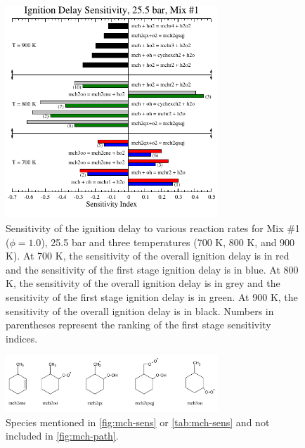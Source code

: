 \documentclass[12pt, letterpaper]{article}
\begin{document}
\begin{figure}
    \centering
    \includegraphics[angle=-90, width=8cm]{../figures/05-MCH/mch-sens}
    \caption{Sensitivity of the ignition delay to various reaction rates
        for Mix \#1 ($\phi=1.0$), 25.5 bar and three temperatures (700 K,
        800 K, and 900 K). At 700 K, the sensitivity of the overall
        ignition delay is in red and the sensitivity of the first stage
        ignition delay is in blue. At 800 K, the sensitivity of the overall
        ignition delay is in grey and the sensitivity of the first stage
        ignition delay is in green. At 900 K, the sensitivity of the overall
        ignition delay is in black. Numbers in parentheses represent the
        ranking of the first stage sensitivity indices.}
    \label{fig:mch-sens}
\end{figure}
\begin{figure}
    \centering
    \includegraphics[width=8cm]{../figures/05-MCH/mch-species}
    \caption{Species mentioned in \autoref{fig:mch-sens} or
        \autoref{tab:mch-sens} and not included in \autoref{fig:mch-path}.}
    \label{fig:mch-species}
\end{figure}
\end{document}
